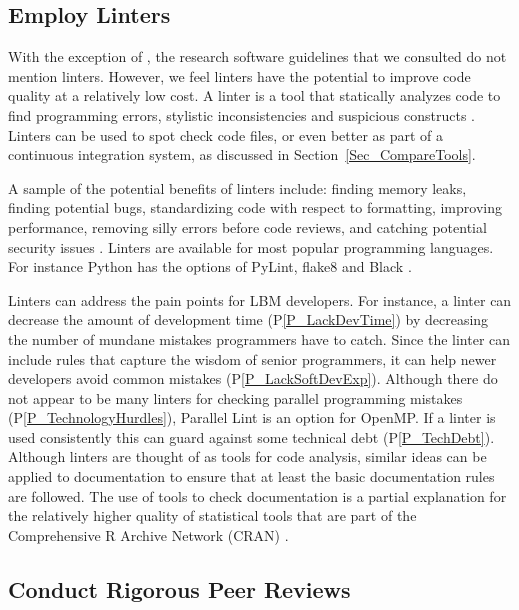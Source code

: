 \documentclass[final, 3p, times, authoryear]{elsarticle}
\newcommand{\ppref}[1]{P\ref{#1}}
\begin{document}
\subsection{Employ Linters} \label{Sec_Linters}

With the exception of \citet{ThielEtAl2020}, the research software guidelines
that we consulted do not mention linters.  However, we feel linters have the
potential to improve code quality at a relatively low cost.  A linter is a tool
that statically analyzes code to find programming errors, stylistic
inconsistencies and suspicious constructs \citep{Wikipedia2022_Lint}. Linters
can be used to spot check code files, or even better as part of a continuous
integration system, as discussed in Section~\ref{Sec_CompareTools}.  

A sample of the potential benefits of linters include: finding memory leaks,
finding potential bugs, standardizing code with respect to formatting, improving
performance, removing silly errors before code reviews, and catching potential
security issues \citep{SourceLevel2022_Lint}.  Linters are available for most
popular programming languages.  For instance Python has the options of PyLint,
flake8 and Black \citep{Zadka2018}.

Linters can address the pain points for LBM developers.  For instance, a linter
can decrease the amount of development time (\ppref{P_LackDevTime}) by
decreasing the number of mundane mistakes programmers have to catch.  Since the
linter can include rules that capture the wisdom of senior programmers, it can
help newer developers avoid common mistakes (\ppref{P_LackSoftDevExp}).  Although
there do not appear to be many linters for checking parallel programming
mistakes (\ppref{P_TechnologyHurdles}), Parallel Lint is an option for OpenMP.
If a linter is used consistently this can guard against some technical debt
(\ppref{P_TechDebt}). Although linters are thought of as tools for code
analysis, similar ideas can be applied to documentation to ensure that at least
the basic documentation rules are followed.  The use of tools to check
documentation is a partial explanation for the relatively higher quality of
statistical tools that are part of the Comprehensive R Archive Network (CRAN)
\citep{SmithEtAl2018_StatSoft}.

\subsection{Conduct Rigorous Peer Reviews} \label{Sec_PeerReview}
\end{document}

